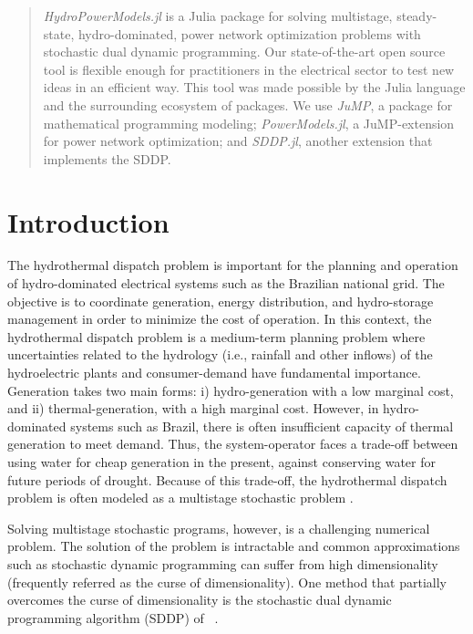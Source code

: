 \documentclass{juliacon}
\begin{document}


\maketitle

\begin{abstract}

\textit{HydroPowerModels.jl} is a Julia package for solving multistage, steady-state, hydro-dominated, power network optimization problems with stochastic dual dynamic programming. Our state-of-the-art open source tool is flexible enough for practitioners in the electrical sector to test new ideas in an efficient way. This tool was made possible by the Julia language and the surrounding ecosystem of packages. We use \textit{JuMP}, a package for mathematical programming modeling; \textit{PowerModels.jl}, a JuMP-extension for power network optimization; and \textit{SDDP.jl}, another extension that implements the SDDP.

\end{abstract}

\section{Introduction}

The hydrothermal dispatch problem is important for the planning and operation of hydro-dominated electrical systems such as the Brazilian national grid. The objective is to coordinate generation, energy distribution, and hydro-storage management in order to minimize the cost of operation. In this context, the hydrothermal dispatch problem is a medium-term planning problem where uncertainties related to the hydrology (i.e., rainfall and other inflows) of the hydroelectric plants and consumer-demand have fundamental importance. Generation takes two main forms: i) hydro-generation with a low marginal cost, and ii) thermal-generation, with a high marginal cost. However, in hydro-dominated systems such as Brazil, there is often insufficient capacity of thermal generation to meet demand. Thus, the system-operator faces a trade-off between using water for cheap generation in the present, against conserving water for future periods of drought. Because of this trade-off, the hydrothermal dispatch problem is often modeled as a multistage stochastic problem \cite{pereira1991multi,maceira_ten_2008,terlaky_marginal_2017}.

Solving multistage stochastic programs, however, is a challenging numerical problem. The solution of the problem is intractable and common approximations such as stochastic dynamic programming can suffer from high dimensionality (frequently referred as the curse of dimensionality). One method that partially overcomes the curse of dimensionality is the stochastic dual dynamic programming algorithm (SDDP) of ~\cite{pereira1991multi}.
\end{document}

